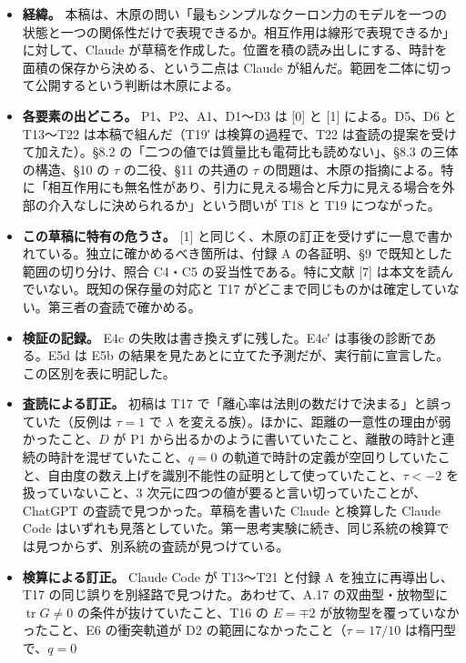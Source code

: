 \documentclass[
  a4paper,
]{ltjsarticle}
\providecommand{\tightlist}{%
  \setlength{\itemsep}{0pt}\setlength{\parskip}{0pt}}
\begin{document}
\begin{itemize}
\tightlist
\item
  \textbf{経緯。}
  本稿は、木原の問い「最もシンプルなクーロン力のモデルを一つの状態と一つの関係性だけで表現できるか。相互作用は線形で表現できるか」に対して、Claude
  が草稿を作成した。位置を積の読み出しにする、時計を面積の保存から決める、という二点は
  Claude が組んだ。範囲を二体に切って公開するという判断は木原による。
\item
  \textbf{各要素の出どころ。} P1、P2、A1、D1〜D3 は {[}0{]} と {[}1{]}
  による。D5、D6 と T13〜T22 は本稿で組んだ（T19′ は検算の過程で、T22
  は査読の提案を受けて加えた）。§8.2
  の「二つの値では質量比も電荷比も読めない」、§8.3 の三体の構造、§10 の
  \(\tau\) の二役、§11 の共通の \(\tau\)
  の問題は、木原の指摘による。特に「相互作用にも無名性があり、引力に見える場合と斥力に見える場合を外部の介入なしに決められるか」という問いが
  T18 と T19 につながった。
\item
  \textbf{この草稿に特有の危うさ。} {[}1{]}
  と同じく、木原の訂正を受けずに一息で書かれている。独立に確かめるべき箇所は、付録
  A の各証明、§9 で既知とした範囲の切り分け、照合 C4・C5
  の妥当性である。特に文献 {[}7{]}
  は本文を読んでいない。既知の保存量の対応と T17
  がどこまで同じものかは確定していない。第三者の査読で確かめる。
\item
  \textbf{検証の記録。} E4c の失敗は書き換えずに残した。E4c′
  は事後の診断である。E5d は E5b
  の結果を見たあとに立てた予測だが、実行前に宣言した。この区別を表に明記した。
\item
  \textbf{査読による訂正。} 初稿は T17
  で「離心率は法則の数だけで決まる」と誤っていた（反例は \(\tau=1\) で
  \(\lambda\)
  を変える族）。ほかに、距離の一意性の理由が弱かったこと、\(D\) が P1
  から出るかのように書いていたこと、離散の時計と連続の時計を混ぜていたこと、\(q=0\)
  の軌道で時計の定義が空回りしていたこと、自由度の数え上げを識別不能性の証明として使っていたこと、\(\tau<-2\)
  を扱っていないこと、3
  次元に四つの値が要ると言い切っていたことが、ChatGPT
  の査読で見つかった。草稿を書いた Claude と検算した Claude Code
  はいずれも見落としていた。第一思考実験に続き、同じ系統の検算では見つからず、別系統の査読が見つけている。
\item
  \textbf{検算による訂正。} Claude Code が T13〜T21 と付録 A
  を独立に再導出し、T17 の同じ誤りを別経路で見つけた。あわせて、A.17
  の双曲型・放物型に \(\operatorname{tr}G\neq0\)
  の条件が抜けていたこと、T16 の \(E=\mp2\)
  が放物型を覆っていなかったこと、E6 の衝突軌道が D2
  の範囲になかったこと（\(\tau=17/10\) は楕円型で、\(q=0\)

\end{itemize}
\end{document}
